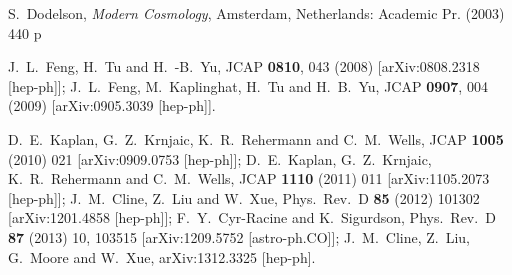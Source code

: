 \documentclass[12pt]{article}
\begin{document}
{{\begin{thebibliography}{999}
  S.~Dodelson,
  {\it Modern Cosmology},
  Amsterdam, Netherlands: Academic Pr. (2003) 440 p

  

  
  
  J.~L.~Feng, H.~Tu and H.~-B.~Yu,
  JCAP {\bf 0810}, 043 (2008)
  [arXiv:0808.2318 [hep-ph]];
  J.~L.~Feng, M.~Kaplinghat, H.~Tu and H.~B.~Yu,
  JCAP {\bf 0907}, 004 (2009)
  [arXiv:0905.3039 [hep-ph]].
  
   D.~E.~Kaplan, G.~Z.~Krnjaic, K.~R.~Rehermann and C.~M.~Wells,
  JCAP {\bf 1005} (2010) 021
  [arXiv:0909.0753 [hep-ph]];
  D.~E.~Kaplan, G.~Z.~Krnjaic, K.~R.~Rehermann and C.~M.~Wells,
  JCAP {\bf 1110} (2011) 011
  [arXiv:1105.2073 [hep-ph]];
  J.~M.~Cline, Z.~Liu and W.~Xue,
  Phys.\ Rev.\ D {\bf 85} (2012) 101302
  [arXiv:1201.4858 [hep-ph]];
  F.~Y.~Cyr-Racine and K.~Sigurdson,
  Phys.\ Rev.\ D {\bf 87} (2013) 10,  103515
  [arXiv:1209.5752 [astro-ph.CO]];
  J.~M.~Cline, Z.~Liu, G.~Moore and W.~Xue,
  arXiv:1312.3325 [hep-ph].
  

\end{thebibliography}}}
\end{document}
